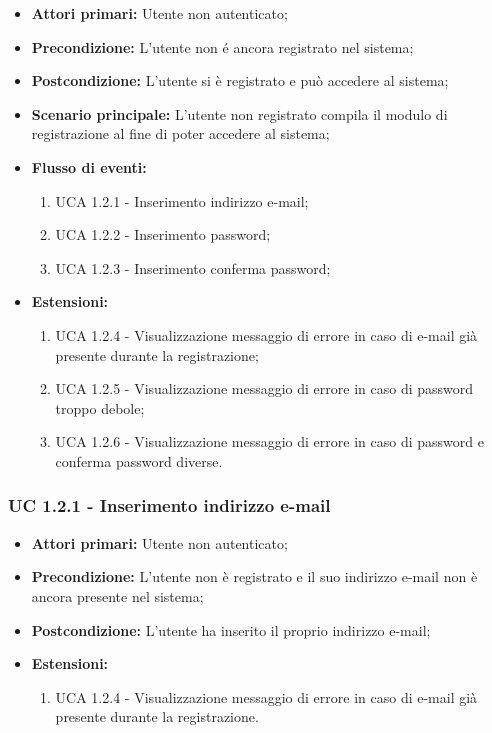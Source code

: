 \begin{itemize}
\item \textbf{Attori primari:} Utente non autenticato;
\item \textbf{Precondizione:} L'utente non é ancora registrato nel sistema;
\item \textbf{Postcondizione:} L'utente si è registrato e può accedere al sistema;
\item \textbf{Scenario principale:} L'utente non registrato compila il modulo di registrazione al fine di poter accedere al sistema;%
\item \textbf{Flusso di eventi:} %
  \begin{enumerate}
        \item UCA 1.2.1 - Inserimento indirizzo e-mail;
        \item UCA 1.2.2 - Inserimento password;
        \item UCA 1.2.3 - Inserimento conferma password;
    \end{enumerate}
\item \textbf{Estensioni:}
	\begin{enumerate}
		\item UCA 1.2.4 - Visualizzazione messaggio di errore in caso di e-mail già presente durante la registrazione;
		\item UCA 1.2.5 - Visualizzazione messaggio di errore in caso di password troppo debole;
		\item UCA 1.2.6 - Visualizzazione messaggio di errore in caso di password e conferma password diverse. 
	\end{enumerate}
\end{itemize}

\subsubsection{UC 1.2.1 - Inserimento indirizzo e-mail}%


\begin{itemize}
\item \textbf{Attori primari:} Utente non autenticato;
\item \textbf{Precondizione:} L'utente non è registrato e il suo indirizzo e-mail non è ancora presente nel sistema;
\item \textbf{Postcondizione:} L'utente ha inserito il proprio indirizzo e-mail;
\item \textbf{Estensioni:}
	\begin{enumerate}
		\item UCA 1.2.4 - Visualizzazione messaggio di errore in caso di e-mail già presente durante la registrazione.
	\end{enumerate}
\end{itemize}




